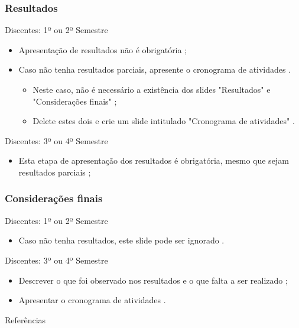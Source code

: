 \documentclass[aspectratio=169]{beamer}
\begin{document}
\begin{frame}
\frametitle{Resultados}

\begin{block}{Discentes: 1º ou 2º Semestre}
    \begin{itemize}
        \item Apresentação de resultados não é obrigatória \cite{teste};
        \item Caso não tenha resultados parciais, apresente o cronograma de atividades \cite{teste}.
        \begin{itemize}
            \item Neste caso, não é necessário a existência dos slides "Resultados" e "Considerações finais" \cite{teste};
            \item Delete estes dois e crie um slide intitulado "Cronograma de atividades" \cite{teste}.
        \end{itemize}
    \end{itemize}
\end{block}

\begin{block}{Discentes: 3º ou 4º Semestre}
    \begin{itemize}
        \item Esta etapa de apresentação dos resultados é obrigatória, mesmo que sejam resultados parciais \cite{teste};
    \end{itemize}
\end{block}

\end{frame}

\begin{frame}
\frametitle{Considerações finais}

\begin{block}{Discentes: 1º ou 2º Semestre}
    \begin{itemize}
        \item Caso não tenha resultados, este slide pode ser ignorado \cite{teste}.
    \end{itemize}
\end{block}

\begin{block}{Discentes: 3º ou 4º Semestre}
    \begin{itemize}
        \item Descrever o que foi observado nos resultados e o que falta a ser realizado \cite{teste};
        \item Apresentar o cronograma de atividades \cite{teste}.
    \end{itemize}
\end{block}

\end{frame}

\begin{frame}[allowframebreaks]{Referências}
	
\end{frame}
\end{document}
